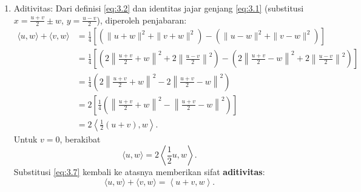 \documentclass[aspectratio=169,11pt]{beamer}
\theoremstyle{definition}
\begin{document}
\begin{frame}[allowframebreaks]{\insertsection}{\insertsubsection}
\begin{itemize}
\begin{enumerate}
            \item Aditivitas: Dari definisi \eqref{eq:3.2} dan identitas jajar genjang \eqref{eq:3.1} (substitusi $x = \frac{u+v}{2} \pm w$, $y = \frac{u-v}{2}$), diperoleh penjabaran:
                  \begin{align*}
                    \langle u,w \rangle + \langle v,w \rangle
                     & = \frac{1}{4} \left[ \left( \|u+w\|^2 + \|v+w\|^2 \right) - \left( \|u-w\|^2 + \|v-w\|^2 \right) \right]                                                                                                         \\
                     & = \frac{1}{4} \left[ \left( 2\left\| \frac{u+v}{2} + w \right\|^2 + 2\left\| \frac{u-v}{2} \right\|^2 \right) - \left( 2\left\| \frac{u+v}{2} - w \right\|^2 + 2\left\| \frac{u-v}{2} \right\|^2 \right) \right] \\
                     & = \frac{1}{4} \left( 2\left\| \frac{u+v}{2} + w \right\|^2 - 2\left\| \frac{u+v}{2} - w \right\|^2 \right)                                                                                                       \\
                     & = 2 \left[ \frac{1}{4} \left( \left\| \frac{u+v}{2} + w \right\|^2 - \left\| \frac{u+v}{2} - w \right\|^2 \right) \right]                                                                                        \\
                     & = 2 \left\langle \frac{1}{2}(u+v), w \right\rangle.
                  \end{align*}
                  Untuk $v=0$, berakibat
                  \begin{equation}
                    \langle u,w \rangle = 2 \left\langle \frac{1}{2}u, w \right\rangle. \label{eq:3.7}
                  \end{equation}
                  Substitusi \eqref{eq:3.7} kembali ke atasnya memberikan sifat \textbf{aditivitas}:
                  \begin{equation}
                    \langle u,w \rangle + \langle v,w \rangle = \left\langle u+v, w \right\rangle. \label{eq:3.8}
                  \end{equation}


\end{enumerate}
\end{itemize}
\end{frame}
\end{document}
